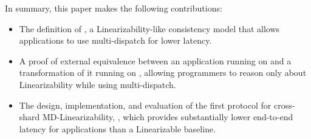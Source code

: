 In summary, this paper makes the following contributions:
\begin{itemize}[leftmargin=*]
\item The definition of \mdl{}, a Linearizability-like consistency model that allows applications to use multi-dispatch for lower latency.
\item A proof of external equivalence between an application running on \sdl{} and a transformation of it running on \mdl{}, allowing programmers to reason only about Linearizability while using multi-dispatch.
\item The design, implementation, and evaluation of the first protocol for cross-shard MD-Linearizability, \sys{}, which provides substantially lower end-to-end latency for applications than a Linearizable baseline.
\end{itemize}












